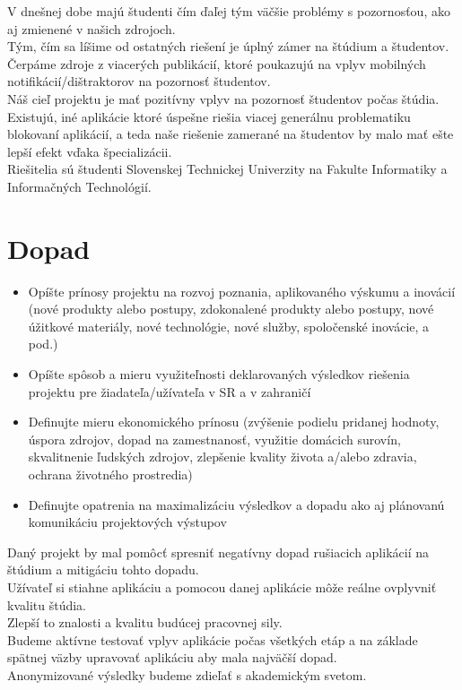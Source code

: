 \documentclass[10pt,slovak,a4paper]{article}
\begin{document}
V dnešnej dobe majú študenti čím ďaľej tým väčšie problémy s pozornosťou, ako aj zmienené v našich zdrojoch.\\
Tým, čím sa líšime od ostatných riešení je úplný zámer na štúdium a študentov.  \\

Čerpáme zdroje z viacerých publikácií, ktoré poukazujú na vplyv mobilných notifikácií/dištraktorov na pozornosť študentov.  \\

Náš cieľ projektu je mať pozitívny vplyv na pozornosť študentov počas štúdia.\\
Existujú, iné aplikácie ktoré úspešne riešia viacej generálnu problematiku blokovaní aplikácií,
a teda naše riešenie zamerané na študentov by malo mať ešte lepší efekt vďaka špecializácii. \\

Riešitelia sú študenti Slovenskej Technickej Univerzity na Fakulte Informatiky a Informačných Technológií.\\

\section{Dopad}
\begin{itemize}
\item Opíšte prínosy projektu na rozvoj poznania, aplikovaného výskumu a inovácií
(nové produkty alebo postupy, zdokonalené produkty alebo postupy, nové úžitkové
materiály, nové technológie, nové služby, spoločenské inovácie, a pod.)
\item Opíšte spôsob a mieru využiteľnosti deklarovaných výsledkov riešenia projektu
pre žiadateľa/užívateľa v SR a v zahraničí
\item Definujte mieru ekonomického prínosu (zvýšenie podielu pridanej hodnoty, úspora
zdrojov, dopad na zamestnanosť, využitie domácich surovín, skvalitnenie ľudských
zdrojov, zlepšenie kvality života a/alebo zdravia, ochrana životného prostredia)
\item Definujte opatrenia na maximalizáciu výsledkov a dopadu ako aj plánovanú
komunikáciu projektových výstupov

\end{itemize}

Daný projekt by mal pomôcť spresniť negatívny dopad rušiacich aplikácií na štúdium a mitigáciu tohto dopadu.\\
Užívateľ si stiahne aplikáciu a pomocou danej aplikácie môže reálne ovplyvniť kvalitu štúdia. \\
Zlepší to znalosti a kvalitu budúcej pracovnej sily.\\
Budeme aktívne testovať vplyv aplikácie počas všetkých etáp a na základe spätnej väzby upravovať aplikáciu aby mala najväčší dopad.  \\
Anonymizované výsledky budeme zdieľať s akademickým svetom.  
\end{document}
